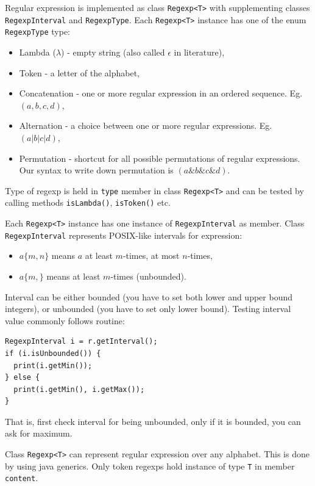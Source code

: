 \documentclass[a4paper,10pt,oneside]{article}
\newcommand{\code}[1]{\texttt{#1}}
\begin{document}
Regular expression is implemented as class \code{Regexp<T>} with supplementing classes \code{RegexpInterval} and \code{RegexpType}.
Each \code{Regexp<T>} instance has one of the enum \code{RegexpType} type:
\begin{itemize}
	\item Lambda ($\lambda$) - empty string (also called $\epsilon$ in literature),
	\item Token - a letter of the alphabet,
	\item Concatenation - one or more regular expression in an ordered sequence. Eg. $(a, b, c, d)$,
	\item Alternation - a choice between one or more regular expressions. Eg. $(a | b | c | d)$,
	\item Permutation - shortcut for all possible permutations of regular expressions. Our syntax to write down permutation is $(a\& b\& c\& d)$.
\end{itemize}
Type of regexp is held in \code{type} member in class \code{Regexp<T>} and can be tested by calling methods \code{isLambda()}, \code{isToken()} etc.

Each \code{Regexp<T>} instance has one instance of \code{RegexpInterval} as member.
Class \code{RegexpInterval} represents POSIX-like intervals for expression:
\begin{itemize}
	\item $a\{m,n\}$ means $a$ at least $m$-times, at most $n$-times,
	\item $a\{m,\}$ means at least $m$-times (unbounded).
\end{itemize}
Interval can be either bounded (you have to set both lower and upper bound integers), or unbounded (you have to set only lower bound).
Testing interval value commonly follows routine:
\begin{verbatim}
RegexpInterval i = r.getInterval();
if (i.isUnbounded()) {
  print(i.getMin());
} else {
  print(i.getMin(), i.getMax());
}
\end{verbatim}
That is, first check interval for being unbounded, only if it is bounded, you can ask for maximum.

Class \code{Regexp<T>} can represent regular expression over any alphabet.
This is done by using java generics.
Only token regexps hold instance of type \code{T} in member \code{content}.
\end{document}
